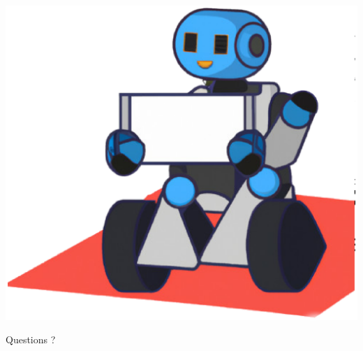\documentclass{beamer}
\begin{document}
\begin{frame}
\begin{center}
\begin{center}
\includegraphics[scale=0.1]{pics/project_logo}
\end{center}
\huge{Questions ?}
\end{center}
\end{frame}
\end{document}
